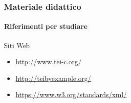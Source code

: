 \begin{frame}
	\frametitle{Materiale didattico}
	\framesubtitle{Riferimenti per studiare}
	\addtocounter{nframe}{1}

	\begin{block}{Siti Web}
		\begin{itemize}
			\item \href{https://www.w3.org/XML/}{\url{http://www.tei-c.org/}}
			\item \href{http://teibyexample.org/}{\url{http://teibyexample.org/}}
			\item \href{https://www.w3.org/standards/xml/}{\url{https://www.w3.org/standards/xml/}}
		\end{itemize}

	\end{block}

\end{frame}


